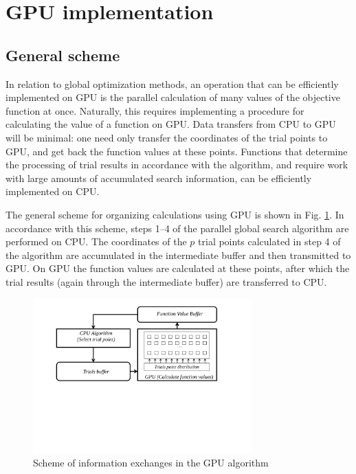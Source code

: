 \documentclass{svproc}
\begin{document}
\section{GPU implementation}

\subsection{General scheme}

In relation to global optimization methods, an operation that can be efficiently implemented on GPU is the parallel calculation of many values of the objective function at once. Naturally, this requires implementing a procedure for calculating the value of a function on GPU. Data transfers from CPU to GPU will be minimal: one need only transfer the coordinates of the trial points to GPU, and get back the function values at these points. Functions that determine the processing of trial results in accordance with the algorithm, and require work with large amounts of accumulated search information, can be efficiently implemented on CPU.

The general scheme for organizing calculations using GPU is shown in Fig. \ref{fig:GPU_Algorithm}. In accordance with this scheme, steps 1--4 of the parallel global search algorithm are performed on CPU. The coordinates of the $p$ trial points calculated in step 4 of the algorithm are accumulated in the intermediate buffer and then transmitted to GPU. On GPU the function values are calculated at these points, after which the trial results (again through the intermediate buffer) are transferred to CPU.
   
   \begin{figure}[t]
    \centering
		\includegraphics[width=0.75\textwidth]{GPU_Algorithm.pdf}
		\caption{Scheme of information exchanges in the GPU algorithm}\label{fig:GPU_Algorithm}
\end{figure}
\end{document}
